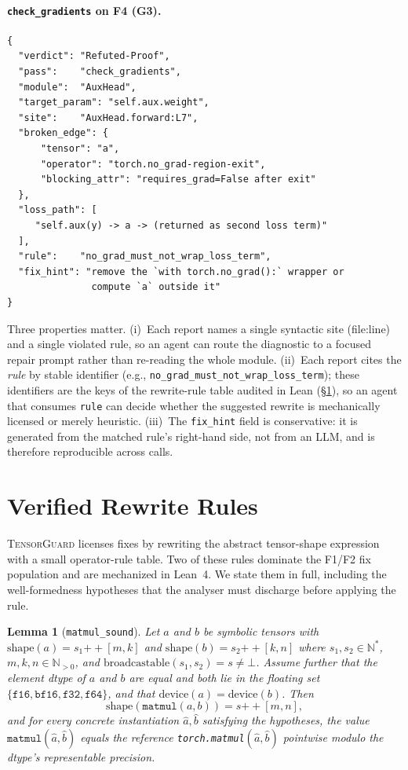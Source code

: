 \documentclass{article}
\newtheorem{lemma}{Lemma}
\begin{document}
\paragraph{\texttt{check\_gradients} on F4 (G3).}
\begin{lstlisting}
{
  "verdict": "Refuted-Proof",
  "pass":    "check_gradients",
  "module":  "AuxHead",
  "target_param": "self.aux.weight",
  "site":    "AuxHead.forward:L7",
  "broken_edge": {
      "tensor": "a",
      "operator": "torch.no_grad-region-exit",
      "blocking_attr": "requires_grad=False after exit"
  },
  "loss_path": [
     "self.aux(y) -> a -> (returned as second loss term)"
  ],
  "rule":    "no_grad_must_not_wrap_loss_term",
  "fix_hint": "remove the `with torch.no_grad():` wrapper or
               compute `a` outside it"
}
\end{lstlisting}

Three properties matter. (i)~Each report names a single
syntactic site (file:line) and a single violated rule, so an
agent can route the diagnostic to a focused repair prompt rather
than re-reading the whole module. (ii)~Each report cites the
\emph{rule} by stable identifier (e.g.,
\texttt{no\_grad\_must\_not\_wrap\_loss\_term}); these
identifiers are the keys of the rewrite-rule table audited in
Lean (\S\ref{sec:lean}), so an agent that consumes
\texttt{rule} can decide whether the suggested rewrite is
mechanically licensed or merely heuristic. (iii)~The
\texttt{fix\_hint} field is conservative: it is generated from
the matched rule's right-hand side, not from an LLM, and is
therefore reproducible across calls.

\section{Verified Rewrite Rules}
\label{sec:lean}

\textsc{TensorGuard} licenses fixes by rewriting the abstract tensor-shape
expression with a small operator-rule table. Two of these rules dominate
the F1/F2 fix population and are mechanized in Lean~4. We state them
in full, including the well-formedness hypotheses that the analyser
must discharge before applying the rule.

\begin{lemma}[\texttt{matmul\_sound}]\label{lem:matmul}
Let $a$ and $b$ be symbolic tensors with
$\mathrm{shape}(a) = s_1 \mathbin{+\!\!+} [m, k]$ and
$\mathrm{shape}(b) = s_2 \mathbin{+\!\!+} [k, n]$ where
$s_1, s_2 \in \mathbb{N}^{*}$, $m,k,n \in \mathbb{N}_{>0}$, and
$\mathrm{broadcastable}(s_1, s_2) = s \neq \bot$.
Assume further that the element dtype of $a$ and $b$ are equal and
both lie in the floating set $\{\mathtt{f16},\mathtt{bf16},\mathtt{f32},\mathtt{f64}\}$,
and that $\mathrm{device}(a) = \mathrm{device}(b)$. Then
\[
  \mathrm{shape}(\mathtt{matmul}(a,b)) = s \mathbin{+\!\!+} [m,n],
\]
and for every concrete instantiation $\hat a, \hat b$ satisfying the
hypotheses, the value $\mathtt{matmul}(\hat a, \hat b)$ equals the
reference \texttt{torch.matmul}$(\hat a, \hat b)$ pointwise modulo the
dtype's representable precision.
\end{lemma}
\end{document}
